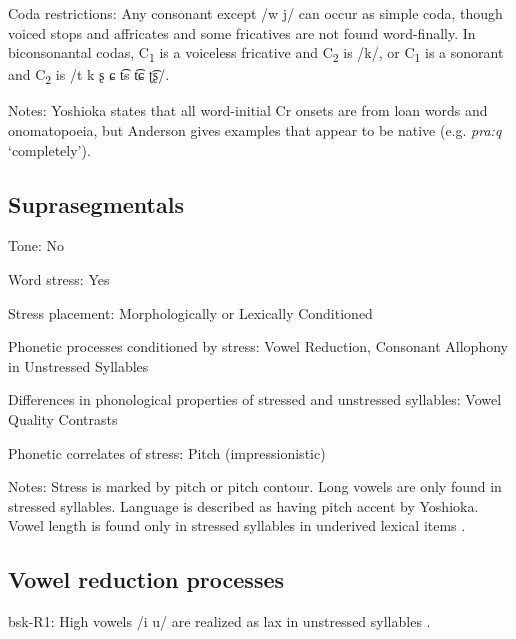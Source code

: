 {\begin{appendixdesc}
\item[Coda restrictions:] Any consonant except /w j/ can occur as simple coda, though voiced stops and affricates and some fricatives are not found word-finally. In biconsonantal codas, C\textsubscript{1} is a voiceless fricative and C\textsubscript{2} is /k/, or C\textsubscript{1} is a sonorant and C\textsubscript{2} is /t k ʂ ɕ t͡s t͡ɕ ʈ͡ʂ/. 

\item[Notes:] Yoshioka states that all word-initial Cr onsets are from loan words and onomatopoeia, but Anderson gives examples that appear to be native (e.g. \textit{pra:q} ‘completely’).
\end{appendixdesc}
\subsection*{Suprasegmentals}
\begin{appendixdesc}
\item[Tone:] No

\item[Word stress:] Yes

\item[Stress placement:] Morphologically or Lexically Conditioned

\item[Phonetic processes conditioned by stress:] Vowel Reduction, Consonant Allophony in Unstressed Syllables

\item[Differences in phonological properties of stressed and unstressed syllables:] Vowel Quality Contrasts

\item[Phonetic correlates of stress:] Pitch (impressionistic)

\item[Notes:] Stress is marked by pitch or pitch contour. Long vowels are only found in stressed syllables. Language is described as having pitch accent by Yoshioka. Vowel length is found only in stressed syllables in underived lexical items \citep[1028]{Anderson1997}.
\end{appendixdesc}
\subsection*{Vowel reduction processes}
\begin{appendixdesc}

\item[bsk-R1:] High vowels /i u/ are realized as lax in unstressed syllables \citep[1029]{Anderson1997}.


\end{appendixdesc}}
